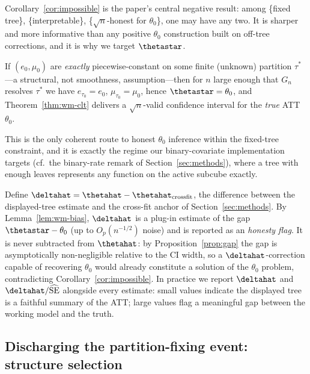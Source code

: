 Corollary~\ref{cor:impossible} is the paper's central negative result: among
\{fixed tree\}, \{interpretable\}, \{$\sqrt{n}$-honest for $\theta_0$\}, one may have
any two. It is sharper and more informative than any positive $\theta_0$ construction
built on off-tree corrections, and it is why we target $\thetastar$.

\begin{corollary}
\label{cor:structural}
If $(e_0, \mu_0)$ are \emph{exactly} piecewise-constant on some finite (unknown)
partition $\tau^\ast$---a structural, not smoothness, assumption---then for $n$ large
enough that $G_n$ resolves $\tau^\ast$ we have $e_{\tau_0} = e_0$,
$\mu_{\tau_0} = \mu_0$, hence $\thetastar = \theta_0$, and Theorem~\ref{thm:wm-clt}
delivers a $\sqrt{n}$-valid confidence interval for the \emph{true} ATT $\theta_0$.
\end{corollary}

This is the only coherent route to honest $\theta_0$ inference within the fixed-tree
constraint, and it is exactly the regime our binary-covariate implementation targets
(cf.\ the binary-rate remark of Section~\ref{sec:methods}), where a tree with enough
leaves represents any function on the active subcube exactly.

\begin{remark}
\label{rem:delta}
Define $\deltahat = \thetahat - \thetahat_{\text{crossfit}}$, the difference between
the displayed-tree estimate and the cross-fit anchor of Section~\ref{sec:methods}. By
Lemma~\ref{lem:wm-bias}, $\deltahat$ is a plug-in estimate of the gap
$\thetastar - \theta_0$ (up to $O_p(n^{-1/2})$ noise) and is reported as an
\emph{honesty flag}. It is never subtracted from $\thetahat$: by
Proposition~\ref{prop:gap} the gap is asymptotically non-negligible relative to the CI
width, so a $\deltahat$-correction capable of recovering $\theta_0$ would already
constitute a solution of the $\theta_0$ problem, contradicting
Corollary~\ref{cor:impossible}. In practice we report $\deltahat$ and
$\deltahat / \widehat{\mathrm{SE}}$ alongside every estimate: small values indicate the
displayed tree is a faithful summary of the ATT; large values flag a meaningful gap
between the working model and the truth.
\end{remark}

\subsection{Discharging the partition-fixing event: structure selection}
\label{sec:selection}

